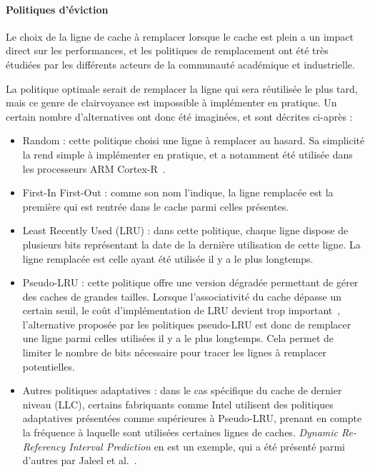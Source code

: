 \paragraph{Politiques d'éviction}

Le choix de la ligne de cache à remplacer lorsque le cache est plein a un impact direct sur les performances, et les politiques de remplacement ont été très étudiées par les différents acteurs de la communauté académique et industrielle.

La politique optimale serait de remplacer la ligne qui sera réutilisée le plus tard, mais ce genre de clairvoyance est impossible à implémenter en pratique.
Un certain nombre d'alternatives ont donc été imaginées, et sont décrites ci-après :
\begin{itemize}
  \item Random : cette politique choisi une ligne à remplacer au hasard. Sa simplicité la rend simple à implémenter en pratique, et a notamment été utilisée dans les processeurs ARM Cortex-R~\cite{ARM-Cortex-R}.
  \item First-In First-Out : comme son nom l'indique, la ligne remplacée est la première qui est rentrée dans le cache parmi celles présentes.
  \item Least Recently Used (LRU) : dans cette politique, chaque ligne dispose de plusieurs bits représentant la date de la dernière utilisation de cette ligne. La ligne remplacée est celle ayant été utilisée il y a le plus longtemps.
  \item Pseudo-LRU : cette politique offre une version dégradée permettant de gérer des caches de grandes tailles.
Lorsque l'associativité du cache dépasse un certain seuil, le coût d'implémentation de LRU devient trop important~\cite{Kedzierski2010}, l'alternative proposée par les politiques pseudo-LRU est donc de remplacer une ligne parmi celles utilisées il y a le plus longtemps.
Cela permet de limiter le nombre de bits nécessaire pour tracer les lignes à remplacer potentielles.
  \item Autres politiques adaptatives : dans le cas spécifique du cache de dernier niveau (LLC), certains fabriquants comme Intel utilisent des politiques adaptatives présentées comme supérieures à Pseudo-LRU, prenant en compte la fréquence à laquelle sont utilisées certaines lignes de caches.
    \emph{Dynamic Re-Referency Interval Prediction} en est un exemple, qui a été présenté parmi d'autres par Jaleel et al.~\cite{Jaleel2010}.
\end{itemize}

